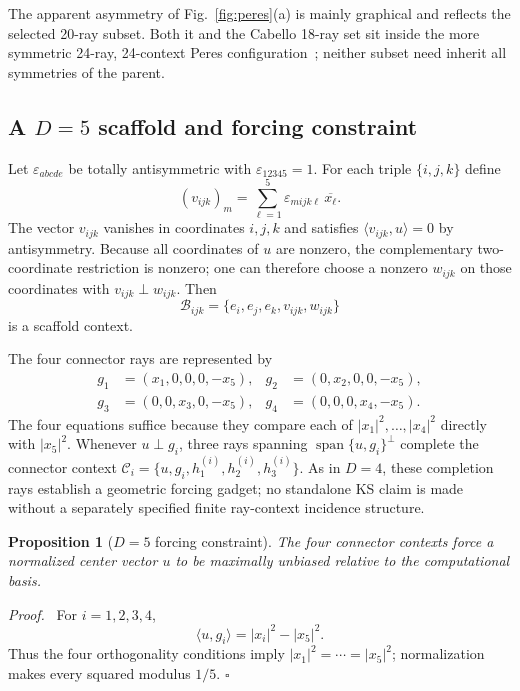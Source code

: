 \documentclass[%
  reprint,
  superscriptaddress,
  showpacs,
  showkeys,
  amsmath,amssymb,
  pra,
  longbibliography,
  floatfix,
  x11names
]{revtex4-2}
\newenvironment{revision}{\begingroup\color{revisionblue}}{\endgroup}
\newtheorem{proposition}{Proposition}
\newenvironment{proof}{\par\noindent\textit{Proof.}\ }{\hfill$\square$\par}
\begin{document}
\begin{revision}
The apparent asymmetry of Fig.~\ref{fig:peres}(a) is mainly graphical and reflects the selected 20-ray subset.  Both it and the Cabello 18-ray set sit inside the more symmetric 24-ray, 24-context Peres configuration~\cite{Pavicic-2005,pavicic-2005csvcorri}; neither subset need inherit all symmetries of the parent.
\end{revision}


\begin{revision}
\subsection{A $D=5$ scaffold and forcing constraint}

Let $\varepsilon_{abcde}$ be totally antisymmetric with $\varepsilon_{12345}=1$.  For each triple $\{i,j,k\}$ define
\[
(v_{ijk})_m=\sum_{\ell=1}^5\varepsilon_{mijk\ell}\,\overline{x_\ell}.
\]
The vector $v_{ijk}$ vanishes in coordinates $i,j,k$ and satisfies $\langle v_{ijk},u\rangle=0$ by antisymmetry.  Because all coordinates of $u$ are nonzero, the complementary two-coordinate restriction is nonzero; one can therefore choose a nonzero $w_{ijk}$ on those coordinates with $v_{ijk}\perp w_{ijk}$.  Then
\[
\mathcal{B}_{ijk}=\{e_i,e_j,e_k,v_{ijk},w_{ijk}\}
\]
is a scaffold context.

The four connector rays are represented by
\begin{align*}
g_1&=(x_1,0,0,0,-x_5),&
g_2&=(0,x_2,0,0,-x_5),\\
g_3&=(0,0,x_3,0,-x_5),&
g_4&=(0,0,0,x_4,-x_5).
\end{align*}
The four equations suffice because they compare each of $|x_1|^2,\ldots,|x_4|^2$ directly with $|x_5|^2$.  Whenever $u\perp g_i$, three rays spanning $\operatorname{span}\{u,g_i\}^{\perp}$ complete the connector context $\mathcal{C}_i=\{u,g_i,h^{(i)}_1,h^{(i)}_2,h^{(i)}_3\}$.  As in $D=4$, these completion rays establish a geometric forcing gadget; no standalone KS claim is made without a separately specified finite ray-context incidence structure.

\begin{proposition}[$D=5$ forcing constraint]
\label{prop:D5forcing}
The four connector contexts force a normalized center vector $u$ to be maximally unbiased relative to the computational basis.
\end{proposition}

\begin{proof}
For $i=1,2,3,4$,
\[
\langle u,g_i\rangle=|x_i|^2-|x_5|^2.
\]
Thus the four orthogonality conditions imply $|x_1|^2=\cdots=|x_5|^2$; normalization makes every squared modulus $1/5$.
\end{proof}
\end{revision}
\end{document}
